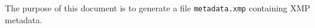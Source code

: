 \documentclass{article}
\begin{document}
The purpose of this document is to generate a file \texttt{metadata.xmp} containing XMP metadata.
\end{document}
